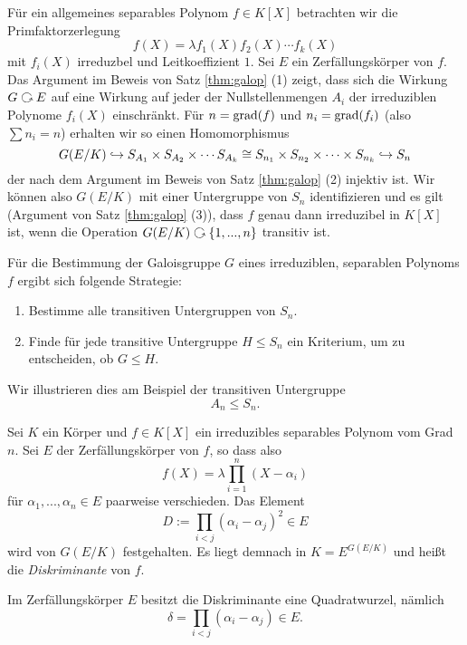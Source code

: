 \documentclass{book}
\begin{document}
\begin{rem}
    \label{rem:allgemeinpermutation}
    Für ein allgemeines separables Polynom $f \in K[X]$ betrachten wir die
    Primfaktorzerlegung
    \[
        f(X) = \lambda f_1(X) f_2(X) \cdots f_k(X)
    \]
    mit $f_i(X)$ irreduzbel und Leitkoeffizient $1$. Sei $E$ ein
    Zerfällungskörper von $f$. Das Argument im Beweis von Satz \ref{thm:galop} (1) 
    zeigt, dass sich die Wirkung $G \actson E$ auf eine Wirkung auf jeder der
    Nullstellenmengen $A_i$ der irreduziblen Polynome $f_i(X)$ einschränkt. Für
    $n = \operatorname{grad}(f)$ und $n_i = \operatorname{grad}(f_i)$ (also $\sum n_i = n$) erhalten wir so einen Homomorphismus
    \[
        G(E/K) \hookrightarrow S_{A_1} \times S_{A_2} \times  \cdots S_{A_k} \cong S_{n_1}
        \times S_{n_2} \times \cdots \times S_{n_k} \hookrightarrow S_n
    \]
    der nach dem Argument im Beweis von Satz \ref{thm:galop} (2) injektiv ist.
    Wir können also $G(E/K)$ mit einer Untergruppe von $S_n$ identifizieren und
    es gilt (Argument von Satz \ref{thm:galop} (3)), dass $f$ genau dann irreduzibel in
    $K[X]$ ist, wenn die Operation $G(E/K) \actson \{1,
    ..., n\}$ transitiv ist. 
\end{rem}

Für die Bestimmung der Galoisgruppe $G$ eines irreduziblen, separablen Polynoms
$f$ ergibt sich folgende Strategie:
\begin{enumerate}
    \item Bestimme alle transitiven Untergruppen von $S_n$.
    \item Finde für jede transitive Untergruppe $H \le S_n$ ein Kriterium, um zu
        entscheiden, ob $G \le H$. 
\end{enumerate}
Wir illustrieren dies am Beispiel der transitiven Untergruppe 
\[
    A_n \le S_n.
\]

\begin{defi}
    \label{defi:diskriminante}
    Sei $K$ ein Körper und $f \in K[X]$ ein irreduzibles separables Polynom vom Grad $n$. Sei $E$ der Zerfällungskörper von $f$, so dass also
    \[
        f(X) = \lambda \prod_{i=1}^n (X - \alpha_i)
    \]
    für $\alpha_1, ..., \alpha_n \in E$ paarweise verschieden. Das Element
    \[
        D := \prod_{i < j } (\alpha_i - \alpha_j)^2 \in E
    \]
    wird von $G(E/K)$ festgehalten. Es liegt demnach in $K = E^{G(E/K)}$ und
    heißt die \emph{Diskriminante} von $f$. 
\end{defi}

\begin{rem}
    \label{rem:diskroot}
    Im Zerfällungskörper $E$ besitzt die Diskriminante eine Quadratwurzel, nämlich
    \[
        \delta = \prod_{i < j} (\alpha_i - \alpha_j) \in E.
    \]
\end{rem}
\end{document}
